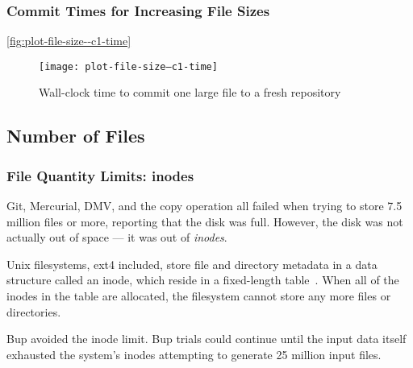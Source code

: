 %

\subsubsection{Commit Times for Increasing File Sizes}


\autoref{fig:plot-file-size--c1-time}

\begin{figure}[p]
    \caption{Wall-clock time to commit one large file to a fresh repository}
    \label{fig:plot-file-size--c1-time}
    \centering

    \explainlogsubfig

    \texttt{[image: plot-file-size--c1-time]}
\end{figure}

%



\subsection{Number of Files}

\subsubsection{File Quantity Limits: inodes}


Git, Mercurial, DMV, and the copy operation all failed when trying to store \num{7.5} million files or more, reporting that the disk was full.
However, the disk was not actually out of space --- it was out of \emph{\glspl{inode}}.


Unix filesystems, ext4 included, store file and directory metadata in a data structure called an \gls{inode}, which reside in a fixed-length table~\cite{unix_timesharing_system}.
When all of the \glspl{inode} in the table are allocated, the filesystem cannot store any more files or directories.

Bup avoided the \gls{inode} limit.
Bup trials could continue until the input data itself exhausted the system's \glspl{inode} attempting to generate \num{25} million input files.

